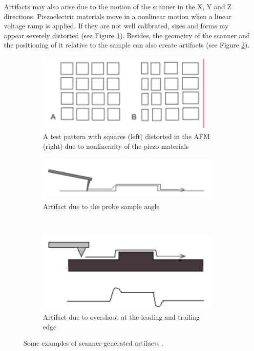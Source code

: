 \documentclass[11pt,a4paper]{article}
\begin{document}
Artifacts may also arise due to the motion of the scanner in the X, Y and Z directions. Piezoelectric materials move in a nonlinear motion when a linear voltage ramp is applied. If they are not well calibrated, sizes and forms my appear severely distorted (see Figure \ref{fig:artifacts_scanner_1}). Besides, the geometry of the scanner and the positioning of it relative to the sample can also create artifacts (see Figure \ref{fig:artifacts_scanner_2}).

\begin{figure}[H]
\centering
\begin{subfigure}[b]{0.45\textwidth}
\includegraphics[width=\textwidth]{artifacts_scanner_1}
\caption{A test pattern with squares (left) distorted in the AFM (right) due to nonlinearity of the piezo materials}
\label{fig:artifacts_scanner_1}
\end{subfigure}
\begin{subfigure}[b]{0.45\textwidth}
\includegraphics[width=\textwidth]{artifacts_scanner_2}
\caption{Artifact due to the probe sample angle}
\label{fig:artifacts_scanner_2}
\end{subfigure}\\\vspace{.2cm}
\begin{subfigure}[b]{0.45\textwidth}
\includegraphics[width=\textwidth]{artifacts_scanner_3}
\caption{Artifact due to overshoot at the leading and trailing edge}
\label{fig:artifacts_scanner_3}
\end{subfigure}
\caption{Some examples of scanner-generated artifacts \cite{artifacts}.}
\label{fig:artifacts_scanner}
\end{figure}
\end{document}
